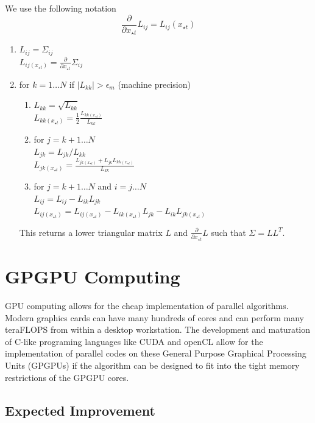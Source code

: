 \documentclass[phd,tocprelim]{cornell}
\begin{document}
We use the following notation
\begin{equation}
    \frac{\partial}{\partial x_{\star t}} L_{ij} = L_{ij} (x_{\star t})
\end{equation}
\begin{enumerate}
 \item $L_{ij} = \Sigma_{ij}$ \\
       $L_{ij (x_{\star t})} = \frac{\partial}{\partial x_{\star t}} \Sigma_{ij}$
 \item for $k = 1\ldots N$ if $|L_{kk}| > \epsilon_{m}$ (machine precision)
 \begin{enumerate}
  \item $L_{kk} = \sqrt{L_{kk}}$ \\
	$L_{kk (x_{\star t})} = \frac{1}{2} \frac{L_{kk (x_{\star t})}}{L_{kk}}$
  \item for $j = k+1\ldots N$ \\
	$L_{jk} = L_{jk}/L_{kk}$ \\
	$L_{jk (x_{\star t})} = \frac{L_{jk (x_{\star t})} + L_{jk}L_{kk (x_{\star t})}}{L_{kk}}$
  \item for $j = k+1\ldots N$ and $i = j\ldots N$ \\
	$L_{ij} = L_{ij} - L_{ik}L_{jk}$ \\
	$L_{ij (x_{\star t})} = L_{ij (x_{\star t})} - L_{ik (x_{\star t})}L_{jk} - L_{ik}L_{jk (x_{\star t})}$
 \end{enumerate}

This returns a lower triangular matrix $L$ and $\frac{\partial}{\partial x_{\star t}} L$ such that $\Sigma = LL^{T}$.

\end{enumerate}

\section{GPGPU Computing} %
\label{sec:GPGPU Computing}

GPU computing allows for the cheap implementation of parallel algorithms. Modern graphics cards can have many hundreds of cores and can perform many teraFLOPS from within a desktop workstation. The development and maturation of C-like programing languages like CUDA and openCL allow for the implementation of parallel codes on these General Purpose Graphical Processing Units (GPGPUs) if the algorithm can be designed to fit into the tight memory restrictions of the GPGPU cores.

\subsection{Expected Improvement}
\label{GPUEI}
\end{document}
